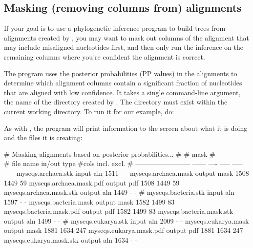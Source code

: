 \subsection{Masking (removing columns from) alignments}

If your goal is to use a phylogenetic inference program to build trees
from alignments created by , you may want to mask
out columns of the alignment that may include misaligned nucleotides
first, and then only run the inference on the remaining columns where
you're confident the alignment is correct. 

\begin{comment}
SSU alignments are commonly used for phylogenetic inference to
characterize the diversity of microorganisms in an environmental
sample. Because alignment errors confound phylogenetic inference, 
it is first recommended to remove columns from, or mask, SSU
alignments to remove regions that are likely to contain at least some
errors. 
\end{comment}

The  program uses the posterior probabilities
(PP values) in the alignments to determine which alignment columns
contain a significant fraction of nucleotides that are aligned with
low confidence. It takes a single command-line argument, the name of
the directory created by . The directory must exist
within the current working directory. To run it for our example, do: 


As with , the program will print information to the
screen about what it is doing and the files it is creating:

\newpage 

\begin{sreoutput}
# Masking alignments based on posterior probabilities...
#
#                                                    mask    
#                                                ------------
# file name                 in/out  type  #cols  incl.  excl.
# ------------------------  ------  ----  -----  -----  -----
  myseqs.archaea.stk         input   aln   1511      -      -
  myseqs.archaea.mask       output  mask   1508   1449     59
  myseqs.archaea.mask.pdf   output   pdf   1508   1449     59
  myseqs.archaea.mask.stk   output   aln   1449      -      -
#
  myseqs.bacteria.stk        input   aln   1597      -      -
  myseqs.bacteria.mask      output  mask   1582   1499     83
  myseqs.bacteria.mask.pdf  output   pdf   1582   1499     83
  myseqs.bacteria.mask.stk  output   aln   1499      -      -
#
  myseqs.eukarya.stk         input   aln   2009      -      -
  myseqs.eukarya.mask       output  mask   1881   1634    247
  myseqs.eukarya.mask.pdf   output   pdf   1881   1634    247
  myseqs.eukarya.mask.stk   output   aln   1634      -      -
\end{sreoutput}

